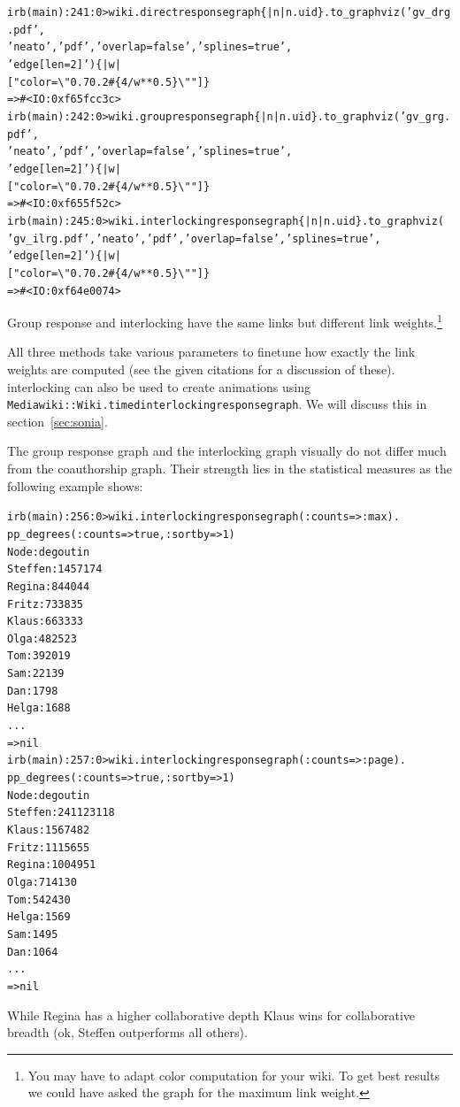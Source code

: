 \documentclass[a4paper]{scrartcl}
\newcounter{tcounter}
\newcommand{\tcount}{\makebox[0pt][r]{\tiny\thetcounter~}}
\newenvironment{typed}{\refstepcounter{tcounter}\bgroup\setlength{\topsep}{0pt}\renewcommand{\FrameCommand}[1]{\fcolorbox{black!30}{bgcolor}{##1}\tcount}\MakeFramed{\FrameRestore}\begin{alltt}\small}{\end{alltt}\endMakeFramed\egroup\par\aftergroup\noindent\aftergroup\ignorespaces}
\newcommand{\rdoc}[1]{\texttt{\color{help}#1}}
\newcommand{\p}{\textcolor{prompt}}
\renewcommand{\c}{\textcolor{cmd}}
\begin{document}
\begin{typed}
\p{irb(main):241:0>} \c{wiki.directresponsegraph \{ |n| n.uid \}.to_graphviz('gv_drg.pdf', 
                                'neato', 'pdf', 'overlap=false', 'splines=true',
                                'edge [len=2]') \{ |w| 
\hfill ["color=\textbackslash"0.7 0.2 #\{4/w**0.5\}\textbackslash""] \}}
=> #<IO:0xf65fcc3c>
\p{irb(main):242:0>} \c{wiki.groupresponsegraph \{ |n| n.uid \}.to_graphviz('gv_grg.pdf', 
                                'neato', 'pdf', 'overlap=false', 'splines=true',
                                'edge [len=2]') \{ |w|
\hfill ["color=\textbackslash"0.7 0.2 #\{4/w**0.5\}\textbackslash""] \}}
=> #<IO:0xf655f52c>
\p{irb(main):245:0>} \c{wiki.interlockingresponsegraph \{ |n| n.uid \}.to_graphviz(
                 'gv_ilrg.pdf', 'neato', 'pdf', 'overlap=false', 'splines=true',
                                'edge [len=2]') \{ |w|
\hfill ["color=\textbackslash"0.7 0.2 #\{4/w**0.5\}\textbackslash""] \}}
=> #<IO:0xf64e0074>
\end{typed}
Group response and interlocking have the same links but different link
weights.\footnote{You may have to adapt color computation for your
  wiki. To get best results we could have asked the graph for the
  maximum link weight.}

All three methods take various parameters to finetune how exactly the
link weights are computed (see the given citations for a discussion of
these). interlocking can also be used to create animations using
\rdoc{Mediawiki::Wiki.timedinterlockingresponsegraph}. We will discuss
this in section~\ref{sec:sonia}.

The group response graph and the interlocking graph visually do not
differ much from the coauthorship graph. Their strength lies in the
statistical measures as the following example shows:
\begin{typed}
\p{irb(main):256:0>} \c{wiki.interlockingresponsegraph(:counts => :max).
\hfill pp_degrees(:counts => true, :sortby => 1)}
Node                          :  deg  out   in
Steffen                       :  145   71   74
Regina                        :   84   40   44
Fritz                         :   73   38   35
Klaus                         :   66   33   33
Olga                          :   48   25   23
Tom                           :   39   20   19
Sam                           :   22   13    9
Dan                           :   17    9    8
Helga                         :   16    8    8
...
=> nil
\p{irb(main):257:0>} \c{wiki.interlockingresponsegraph(:counts => :page).
\hfill pp_degrees(:counts => true, :sortby => 1)}
Node                          :  deg  out   in
Steffen                       :  241  123  118
Klaus                         :  156   74   82
Fritz                         :  111   56   55
Regina                        :  100   49   51
Olga                          :   71   41   30
Tom                           :   54   24   30
Helga                         :   15    6    9
Sam                           :   14    9    5
Dan                           :   10    6    4
...
=> nil
\end{typed}
While Regina has a higher collaborative depth Klaus wins for
collaborative breadth (ok, Steffen outperforms all others). 
\end{document}
